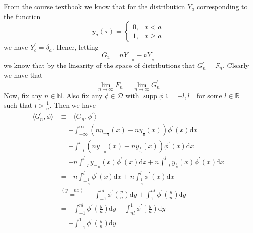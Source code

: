 \documentclass{article}
\DeclareMathOperator\supp{supp}
\begin{document}
From the course textbook we know that for the distribution $Y_a$
corresponding to the function
%
\begin{equation*}
    y_a(x) =
        \begin{cases}
            0, & x < a \\
            1, & x \geq a
        \end{cases}
\end{equation*}
%
we have $Y_a^\prime = \delta_a$. Hence, letting
%
\begin{equation*}
    G_n = n Y_{- \frac{1}{n}} - n Y_{\frac{1}{n}}
\end{equation*}
%
we know that by the linearity of the space of distributions that
$G_n^\prime = F_n$. Clearly we have that
%
\begin{equation*}
    \lim_{n \to \infty} F_n = \lim_{n \to \infty} G_n^\prime
\end{equation*}
%
Now, fix any $n \in \mathbb{N}$. Also fix any $\phi \in \mathcal{D}$
with $\supp \phi \subseteq [-l, l]$ for some $l \in \mathbb{R}$ such
that $l > \frac{1}{n}$. Then we have
%
\begin{align*}
    \langle G_n^\prime, \phi \rangle
        &\equiv - \langle G_n, \phi^\prime \rangle \\
        &= - \int_{-\infty}^{\infty}
            \left(n y_{- \frac{1}{n}}(x) - n y_{\frac{1}{n}}(x)\right) \phi^\prime(x)
            \mathrm{d} x \\
        &= - \int_{-l}^{l}
            \left(n y_{- \frac{1}{n}}(x) - n y_{\frac{1}{n}}(x)\right) \phi^\prime(x)
            \mathrm{d} x \\
        &= - n \int_{-l}^{l} y_{- \frac{1}{n}}(x) \phi^\prime(x) \mathrm{d} x
            + n \int_{-l}^{l} y_{\frac{1}{n}}(x) \phi^\prime(x) \mathrm{d} x \\
        &= - n \int_{- \frac{1}{n}}^{l} \phi^\prime(x) \mathrm{d} x
            + n \int_{\frac{1}{n}}^{l} \phi^\prime(x) \mathrm{d} x \\
        &\stackrel{(y = n x)}{=}
            - \int_{-1}^{n l} \phi^\prime\left(\frac{y}{n}\right) \mathrm{d} y
            + \int_{1}^{n l} \phi^\prime\left(\frac{y}{n}\right) \mathrm{d} y \\
        &= - \int_{-1}^{n l} \phi^\prime\left(\frac{y}{n}\right) \mathrm{d} y
            - \int_{n l}^{1} \phi^\prime\left(\frac{y}{n}\right) \mathrm{d} y \\
        &= - \int_{-1}^{1} \phi^\prime\left(\frac{y}{n}\right) \mathrm{d} y \\
\end{align*}
\end{document}
